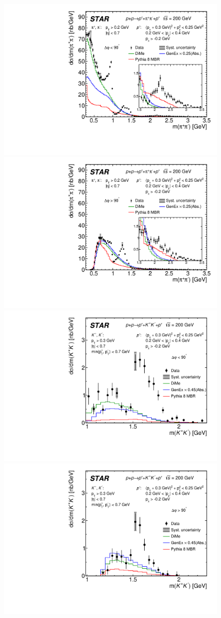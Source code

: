 \begin{figure}[h]
\centering
\hspace*{5pt}
\includegraphics[width=.46\textwidth,page=1]{graphics/physicsResults/FinalResult_InvMass_DeltaPhiBin1_pion.pdf}
\hfill
\includegraphics[width=.46\textwidth,page=1]{graphics/physicsResults/FinalResult_InvMass_DeltaPhiBin2_pion.pdf}
\hspace*{5pt}
\newline
\hspace*{5pt}
\includegraphics[width=.46\textwidth,page=1]{graphics/physicsResults/FinalResult_InvMass_DeltaPhiBin1_kaon.pdf}
\hfill
\includegraphics[width=.46\textwidth,page=1]{graphics/physicsResults/FinalResult_InvMass_DeltaPhiBin2_kaon.pdf}
\hspace*{5pt}
\newline

\end{figure}
